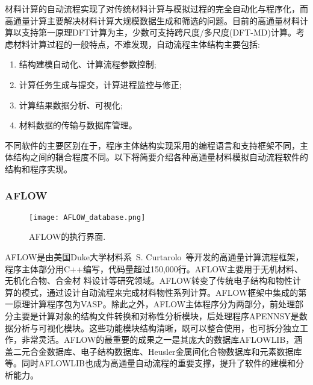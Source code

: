 材料计算的自动流程实现了对传统材料计算与模拟过程的完全自动化与程序化，而高通量计算主要解决材料计算大规模数据生成和筛选的问题。目前的高通量材料计算以支持第一原理\textrm{DFT}计算为主，少数可支持跨尺度/多尺度\textrm{(DFT-MD)}计算。考虑材料计算过程的一般特点，不难发现，自动流程主体结构主要包括: 
\begin{enumerate}
	\item 结构建模自动化、计算流程参数控制;
	\item 计算任务生成与提交，计算进程监控与修正;
	\item 计算结果数据分析、可视化;
	\item 材料数据的传输与数据库管理。
\end{enumerate}
不同软件的主要区别在于，程序主体结构实现采用的编程语言和支持框架不同，主体结构之间的耦合程度不同。以下将简要介绍各种高通量材料模拟自动流程软件的结构和程序实现。

\subsubsection{\rm{AFLOW}}
\begin{figure}[h!]
\centering
\texttt{[image: AFLOW\_database.png]}%
\caption{\textrm{AFLOW}的执行界面.}%
\label{Auto_Flow_Platform-1}
\end{figure}
\textrm{AFLOW}是由美国\textrm{Duke}大学材料系~\textrm{S. Curtarolo}~等开发的高通量计算流程框架，程序主体部分用\textrm{C++}编写，代码量超过\textrm{150,000}行。\textrm{AFLOW}主要用于无机材料、无机化合物、合金材 料设计等研究领域。\textrm{AFLOW}转变了传统电子结构和物性计算的模式，通过设计自动流程来完成材料物性系列计算。\textrm{AFLOW}框架中集成的第一原理计算程序包为\textrm{VASP}。除此之外，\textrm{AFLOW}主体程序分为两部分，前处理部分主要是计算对象的结构文件转换和对称性分析模块，后处理程序\textrm{APENNSY}是数据分析与可视化模块。这些功能模块结构清晰，既可以整合使用，也可拆分独立工作，非常灵活。\textrm{AFLOW}的最重要的成果之一是其庞大的数据库\textrm{AFLOWLIB}，涵盖二元合金数据库、电子结构数据库、\textrm{Heusler}金属间化合物数据库和元素数据库等。同时\textrm{AFLOWLIB}也成为高通量自动流程的重要支撑，提升了软件的建模和分析能力。

